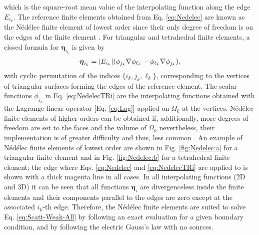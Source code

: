 %
which is the square-root mean value of the interpolating function along the edge $E_{i_k}$. The reference finite elements obtained from Eq. \eqref{eq:Nedelec} are known as the Nédélec finite element of lowest order since their only degree of freedom is on the edges of the finite element \cite{bergot_generation_2010}. For triangular and tetrahedral finite elements, a closed formula for $\boldsymbol{\eta}_{i_k}$ is given by \cite{jin_theory_2010,larson_finite_2013,bondeson_computational_2005}
%
\begin{align}
    \boldsymbol{\eta}_{i_k} = \abs{E_{i_k}} \qty(\phi_{j_k}\nabla\phi_{\ell_k}
                                                    - \phi_{\ell_k}\nabla\phi_{j_k} ),
    \label{eq:NedelecTRi}
\end{align}
%
%
%
with cyclic permutation of the indices $\{i_k, j_k, \ell_k\}$, corresponding to the vertices of triangular surfaces forming  the edges of the reference element. The scalar functions $\phi_{j_k}$ in Eq. \eqref{eq:NedelecTRi}  are the interpolating functions obtained with the Lagrange linear operator [Eq. \eqref{eq:Lag}] applied on $\Omega_k$ at the vertices. Nédélec finite elements of higher orders can be obtained if, additionally, more degrees of freedom are set to the faces and the volume of $\Omega_k$ \cite{bergot_generation_2010} nevertheless, their implementation is of greater difficulty and thus, less common \cite{larson_finite_2013,jin_theory_2010}. An example of Nédélec finite elements of lowest order are shown in Fig. \ref{fig:Nedelec:a} for a triangular finite element and in Fig. \ref{fig:Nedelec:b} for a tetrahedral finite element; the edge where Eqs. \eqref{eq:Nedelec} and \eqref{eq:NedelecTRi} are applied to is shown with a thick magenta line in all cases. In all interpolating functions (2D and 3D) it can be seen that all functions $\boldsymbol{\eta}_i$ are divergenceless inside the finite elements and their components parallel to the edges are zero except at the associated $i_k$-th edge. Therefore, the Nédélec finite elements are suited to solve Eq. \eqref{eq:Scatt-Weak-All}  by following an exact evaluation for a given boundary condition, and by following the electric Gauss's law with no sources.

